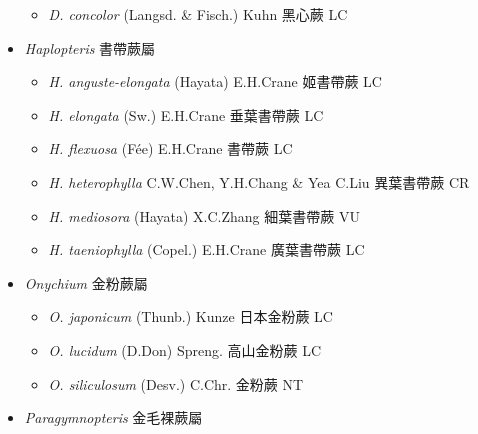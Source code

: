 \begin{itemize}
  \begin{itemize}
        \item[] \textit{D. concolor} (Langsd. \& Fisch.) Kuhn  黑心蕨   LC
  \end{itemize}
 \item[] \textit{Haplopteris} 書帶蕨屬
                                
  \begin{itemize}
        \item[] \textit{H. anguste-elongata} (Hayata) E.H.Crane  姬書帶蕨   LC
        \item[] \textit{H. elongata} (Sw.) E.H.Crane  垂葉書帶蕨   LC
        \item[] \textit{H. flexuosa} (Fée) E.H.Crane  書帶蕨   LC
        \item[] \textit{H. heterophylla} C.W.Chen, Y.H.Chang \& Yea C.Liu  異葉書帶蕨   CR
        \item[] \textit{H. mediosora} (Hayata) X.C.Zhang  細葉書帶蕨   VU
        \item[] \textit{H. taeniophylla} (Copel.) E.H.Crane  廣葉書帶蕨   LC
  \end{itemize}
 \item[] \textit{Onychium} 金粉蕨屬
                                
  \begin{itemize}
        \item[] \textit{O. japonicum} (Thunb.) Kunze  日本金粉蕨   LC
        \item[] \textit{O. lucidum} (D.Don) Spreng.  高山金粉蕨   LC
        \item[] \textit{O. siliculosum} (Desv.) C.Chr.  金粉蕨   NT
  \end{itemize}
 \item[] \textit{Paragymnopteris} 金毛裸蕨屬
                                

\end{itemize}
